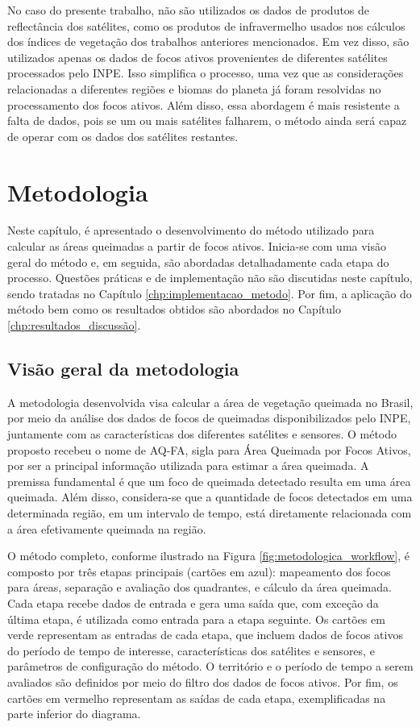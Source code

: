 \documentclass[cic,tc]{iiufrgs}
\begin{document}
No caso do presente trabalho, não são utilizados os dados de produtos de reflectância dos satélites, como os produtos de infravermelho usados nos cálculos dos índices de vegetação dos trabalhos anteriores mencionados. Em vez disso, são utilizados apenas os dados de focos ativos provenientes de diferentes satélites processados pelo INPE. Isso simplifica o processo, uma vez que as considerações relacionadas a diferentes regiões e biomas do planeta já foram resolvidas no processamento dos focos ativos. Além disso, essa abordagem é mais resistente a falta de dados, pois se um ou mais satélites falharem, o método ainda será capaz de operar com os dados dos satélites restantes.




\chapter{Metodologia}

Neste capítulo, é apresentado o desenvolvimento do método utilizado para calcular as áreas queimadas a partir de focos ativos. Inicia-se com uma visão geral do método e, em seguida, são abordadas detalhadamente cada etapa do processo. Questões práticas e de implementação não são discutidas neste capítulo, sendo tratadas no Capítulo \ref{chp:implementacao_metodo}. Por fim, a aplicação do método bem como os resultados obtidos são abordados no Capítulo \ref{chp:resultados_discussão}.

\section{Visão geral da metodologia}

A metodologia desenvolvida visa calcular a área de vegetação queimada no Brasil, por meio da análise dos dados de focos de queimadas disponibilizados pelo INPE, juntamente com as características dos diferentes satélites e sensores. O método proposto recebeu o nome de AQ-FA, sigla para Área Queimada por Focos Ativos, por ser a principal informação utilizada para estimar a área queimada. A premissa fundamental é que um foco de queimada detectado resulta em uma área queimada. Além disso, considera-se que a quantidade de focos detectados em uma determinada região, em um intervalo de tempo, está diretamente relacionada com a área efetivamente queimada na região.

O método completo, conforme ilustrado na Figura \ref{fig:metodologica_workflow}, é composto por três etapas principais (cartões em azul): mapeamento dos focos para áreas, separação e avaliação dos quadrantes, e cálculo da área queimada. Cada etapa recebe dados de entrada e gera uma saída que, com exceção da última etapa, é utilizada como entrada para a etapa seguinte. Os cartões em verde representam as entradas de cada etapa, que incluem dados de focos ativos do período de tempo de interesse, características dos satélites e sensores, e parâmetros de configuração do método. O território e o período de tempo a serem avaliados são definidos por meio do filtro dos dados de focos ativos. Por fim, os cartões em vermelho representam as saídas de cada etapa, exemplificadas na parte inferior do diagrama.
\end{document}
